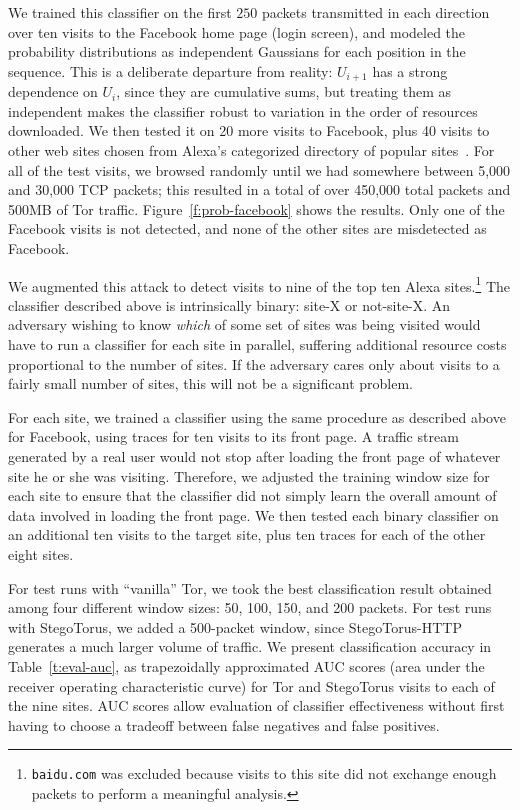 We trained this classifier on the first $250$ packets transmitted in
each direction over ten visits to the Facebook home page (login
screen), and modeled the probability distributions as independent
Gaussians for each position in the sequence. This is a deliberate
departure from reality: $U_{i+1}$ has a strong dependence on $U_i$,
since they are cumulative sums, but treating them as independent makes
the classifier robust to variation in the order of resources
downloaded.  We then tested it on 20 more visits to Facebook, plus 40
visits to other web sites chosen from Alexa's categorized directory of
popular sites~\cite{d-alexa}.  For all of the test visits, we browsed
randomly until we had somewhere between 5,000 and 30,000 TCP packets;
this resulted in a total of over 450,000 total packets and 500MB of
Tor traffic. Figure~\ref{f:prob-facebook} shows the results.  Only one
of the Facebook visits is not detected, and none of the other sites
are misdetected as Facebook.

We augmented this attack to detect visits to nine of the top ten Alexa
sites.\footnote{\texttt{baidu.com} was excluded because visits to this
  site did not exchange enough packets to perform a meaningful
  analysis.} The classifier described above is intrinsically binary:
site-X or not-site-X.  An adversary wishing to know \emph{which} of
some set of sites was being visited would have to run a classifier for
each site in parallel, suffering additional resource costs
proportional to the number of sites.  If the adversary cares only
about visits to a fairly small number of sites, this will not be a
significant problem.

For each site, we trained a classifier using the same procedure as
described above for Facebook, using traces for ten visits to its front
page.  A traffic stream generated by a real user would not stop after
loading the front page of whatever site he or she was visiting.
Therefore, we adjusted the training window size for each site to
ensure that the classifier did not simply learn the overall amount of
data involved in loading the front page.  We then tested each binary
classifier on an additional ten visits to the target site, plus ten
traces for each of the other eight sites.

For test runs with “vanilla” Tor, we took the best classification
result obtained among four different window sizes: 50, 100, 150, and
200 packets.  For test runs with StegoTorus, we added a 500-packet
window, since StegoTorus-HTTP generates a much larger volume of
traffic.  We present classification accuracy in
Table~\ref{t:eval-auc}, as trapezoidally approximated AUC scores (area
under the receiver operating characteristic curve) for Tor and
StegoTorus visits to each of the nine sites.  AUC scores allow
evaluation of classifier effectiveness without first having to choose
a tradeoff between false negatives and false positives.

